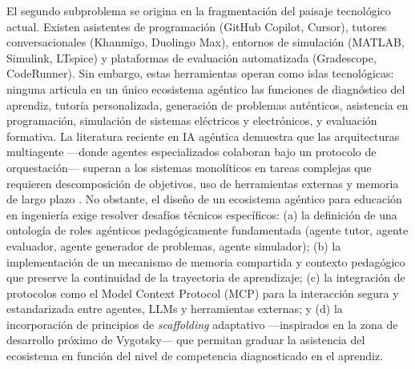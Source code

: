 El segundo subproblema se origina en la fragmentación del paisaje tecnológico actual.
Existen asistentes de programación (GitHub Copilot, Cursor), tutores conversacionales
(Khanmigo, Duolingo Max), entornos de simulación (MATLAB, Simulink, LTspice) y
plataformas de evaluación automatizada (Gradescope, CodeRunner). Sin embargo, estas
herramientas operan como islas tecnológicas: ninguna articula en un único ecosistema
agéntico las funciones de diagnóstico del aprendiz, tutoría personalizada, generación de
problemas auténticos, asistencia en programación, simulación de sistemas eléctricos y
electrónicos, y evaluación formativa. La literatura reciente en IA agéntica demuestra que
las arquitecturas multiagente —donde agentes especializados colaboran bajo un protocolo de
orquestación— superan a los sistemas monolíticos en tareas complejas que requieren
descomposición de objetivos, uso de herramientas externas y memoria de largo plazo
\cite{xi2023rise, wang2024survey}. No obstante, el diseño de un ecosistema agéntico para
educación en ingeniería exige resolver desafíos técnicos específicos: (a) la definición de
una ontología de roles agénticos pedagógicamente fundamentada (agente tutor, agente
evaluador, agente generador de problemas, agente simulador); (b) la implementación de un
mecanismo de memoria compartida y contexto pedagógico que preserve la continuidad de la
trayectoria de aprendizaje; (c) la integración de protocolos como el Model Context
Protocol (MCP) para la interacción segura y estandarizada entre agentes, LLMs y
herramientas externas; y (d) la incorporación de principios de \emph{scaffolding}
adaptativo —inspirados en la zona de desarrollo próximo de Vygotsky— que permitan graduar
la asistencia del ecosistema en función del nivel de competencia diagnosticado en el
aprendiz.


